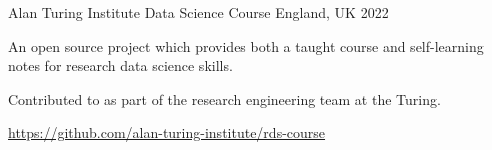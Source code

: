 \begin{cventries}
  \cventry
    {Alan Turing Institute} %
    {Data Science Course} %
    {England, UK} %
    {2022} %
    {
      \begin{cvitems} %
        \item {An open source project which provides both a taught course and self-learning notes for research data science skills.}
        \item{Contributed to as part of the research engineering team at the Turing.}
        \item {\url{https://github.com/alan-turing-institute/rds-course}}
      \end{cvitems}
    }

\end{cventries}

